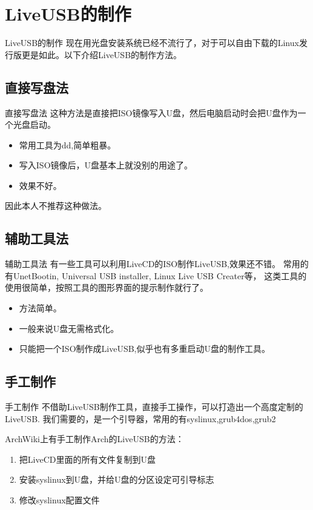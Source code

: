 \documentclass{beamer}
\begin{document}
\section{LiveUSB的制作}
\begin{frame}{LiveUSB的制作}
现在用光盘安装系统已经不流行了，对于可以自由下载的Linux发行版更是如此。以下介绍LiveUSB的制作方法。
\end{frame}

\subsection{直接写盘法}
\begin{frame}{直接写盘法}
这种方法是直接把ISO镜像写入U盘，然后电脑启动时会把U盘作为一个光盘启动。
\begin{itemize}
\item 常用工具为dd,简单粗暴。
\item 写入ISO镜像后，U盘基本上就没别的用途了。
\item 效果不好。
\end{itemize}

因此本人不推荐这种做法。
\end{frame}

\subsection{辅助工具法}
\begin{frame}{辅助工具法}
有一些工具可以利用LiveCD的ISO制作LiveUSB,效果还不错。
常用的有UnetBootin, Universal USB installer, Linux Live USB Creater等，
这类工具的使用很简单，按照工具的图形界面的提示制作就行了。
\begin{itemize}
\item 方法简单。
\item 一般来说U盘无需格式化。
\item 只能把一个ISO制作成LiveUSB,似乎也有多重启动U盘的制作工具。
\end{itemize}
\end{frame}

\subsection{手工制作}
\begin{frame}{手工制作}
不借助LiveUSB制作工具，直接手工操作，可以打造出一个高度定制的LiveUSB.
我们需要的，是一个引导器，常用的有syslinux,grub4dos,grub2

ArchWiki上有手工制作Arch的LiveUSB的方法：
\begin{enumerate}
\item 把LiveCD里面的所有文件复制到U盘
\item 安装syslinux到U盘，并给U盘的分区设定可引导标志
\item 修改syslinux配置文件
\end{enumerate}

\end{frame}
\end{document}
